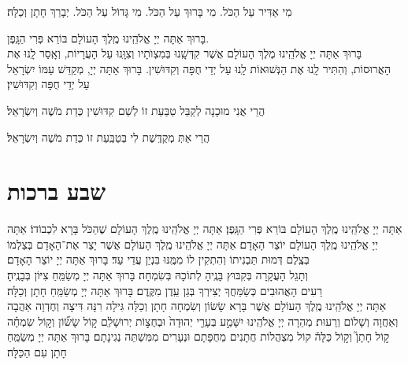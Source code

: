 \documentclass[twoside, openany, parskip=half, 11pt]{book}
\begin{document}
מִי אַדִּיר עַל הַכֹּל. מִי בָּרוּךְ עַל הַכֹּל. מִי גָּדוֹל עַל הַכֹּל. יְבָרֵךְ חָתָן וְכַלָּה׃

בָּרוּךְ אַתָּה יְיָ אֱלֹהֵֽינוּ מֶֽלֶךְ הָעוֹלָם בּוֹרֵא פְּרִי הַגָּֽפֶן.\\
בָּרוּךְ אַתָּה יְיָ אֱלֹהֵֽינוּ מֶלֶךְ הָעוֹלָם אֲשֶׁר קִדְּשָֽׁנוּ בְּמִצְוֺתָיו וְצִוָּֽנוּ עַל הָעֲרָיוֹת, וְאָֽסַר לָֽנוּ אֶת הָאֲרוּסוֹת, וְהִתִּיר לָֽנוּ אֶת הַנְּשׁוּאוֹת לָֽנוּ עַל יְדֵי חֻפָּה וְקִדּוּשִׁין. בָּרוּךְ אַתָּה יְיָ, מְקַדֵּשׁ עַמּוֹ יִשְׂרָאֵל עַל יְדֵי חֻפָּה וְקִדּוּשִׁין׃

הֲרֵי אֲנִי מוּכָנָה לְקַבֵּל טַבַּעַת זוֹ לְשֵׁם קִדּוּשִׁין כְּדַת מֹשֶׁה וְיִשְׂרָאֵל׃

הֲרֵי אַתְּ מְקֻדֶּֽשֶׁת לִי בְּטַבַּֽעַת זוֹ כְּדַת מֹשֶׁה וְיִשְׂרָאֵל׃


\section[שבע ברכות]{ שבע ברכות }


אַתָּה יְיָ אֱלֹהֵֽינוּ מֶֽלֶךְ הָעוֹלָם בּוֹרֵא פְּרִי הַגָּֽפֶן׃\hfill \break
{}
אַתָּה יְיָ אֱלֹהֵֽינוּ מֶֽלֶךְ הָעוֹלָם שֶׁהַכֹּל בָּרָא לִכְבוֹדוֹ׃\hfill \break
{}
אַתָּה יְיָ אֱלֹהֵֽינוּ מֶֽלֶךְ הָעוֹלָם יוֹצֵר הָאָדָם׃\hfill \break
{}
אַתָּה יְיָ אֱלֹהֵֽינוּ מֶֽלֶךְ הָעוֹלָם אֲשֶׁר יָצַר אֶת־הָאָדָם בְּצַלְמוֹ
בְּצֶֽלֶם דְּמוּת תַּבְנִיתוֹ וְהִתְקִין לוֹ מִמֶּֽנּוּ בִּנְיַן עֲדֵי עַד׃ בָּרוּךְ אַתָּה יְיָ יוֹצֵר הָאָדָם׃\\
וְתָגֵל הָעֲקָרָה בְּקִבּוּץ בָּנֶֽיהָ לְתוֹכָהּ בְּשִׂמְחָה׃
בָּרוּךְ אַתָּה יְיָ מְשַׂמֵּֽחַ צִיּוֹן בְּבָנֶֽיהָ׃\\
רֵעִים הָאֲהוּבִים כְּשַׂמֵּחֲךָ יְצִירְךָ בְּגַן עֵֽדֶן מִקֶּֽדֶם׃
בָּרוּךְ אַתָּה יְיָ מְשַׂמֵּֽחַ חָתָן וְכַלָּה׃\\
אַתָּה יְיָ אֱלֹהֵֽינוּ מֶֽלֶךְ הָעוֹלָם
אֲשֶׁר בָּרָא שָׂשׂוֹן וְשִׂמְחָה חָתָן וְכַלָּה גִּילָה רִנָּה דִּיצָה וְחֶדְוָה
אַהֲבָה וְאַחֲוָה וְשָׁלוֹם וְרֵעוּת׃
מְהֵרָה יְיָ אֱלֹהֵֽינוּ יִשָּׁמַ֣ע
בְּעָרֵ֤י יְהוּדָה֙ וּבְחֻצ֣וֹת יְרוּשָׁלַ֔‍ִם
ק֣וֹל שָׂשׂ֞וֹן וְק֣וֹל שִׂמְחָ֗ה ק֣וֹל חָתָן֮ וְק֣וֹל כַּלָּה֒
קוֹל מִצְהֲלוֹת חֲתָנִים מֵחֻפָּתָם וּנְעָרִים מִמִּשְׁתֵּה נְגִינָתָם׃
בָּרוּךְ אַתָּה יְיָ מְשַׂמֵּֽחַ חָתָן עִם הַכַּלָּה׃
\end{document}
